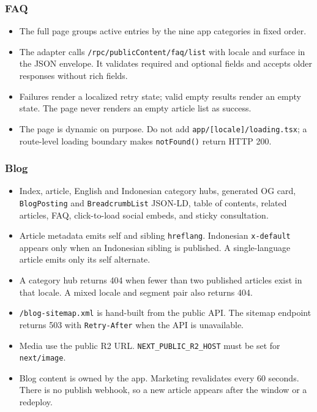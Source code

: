 \documentclass[11pt,a4paper]{article}
\newcommand{\code}[1]{\texttt{#1}}
\begin{document}
\subsubsection{FAQ}
\begin{itemize}
	\item The full page groups active entries by the nine app categories in fixed order.
	\item The adapter calls \code{/rpc/publicContent/\allowbreak faq/list} with locale and surface in the JSON envelope. It validates required and optional fields and accepts older responses without rich fields.
	\item Failures render a localized retry state; valid empty results render an empty state. The page never renders an empty article list as success.
	\item The page is dynamic on purpose. Do not add \code{app/[locale]/\allowbreak loading.tsx}; a route-level loading boundary makes \code{notFound()} return HTTP 200.
\end{itemize}

\subsubsection{Blog}
\begin{itemize}
	\item Index, article, English and Indonesian category hubs, generated OG card, \code{BlogPosting} and \code{BreadcrumbList} JSON-LD, table of contents, related articles, FAQ, click-to-load social embeds, and sticky consultation.
	\item Article metadata emits self and sibling \code{hreflang}. Indonesian \code{x-default} appears only when an Indonesian sibling is published. A single-language article emits only its self alternate.
	\item A category hub returns 404 when fewer than two published articles exist in that locale. A mixed locale and segment pair also returns 404.
	\item \code{/blog-sitemap.xml} is hand-built from the public API. The sitemap endpoint returns 503 with \code{Retry-After} when the API is unavailable.
	\item Media use the public R2 URL. \code{NEXT\_PUBLIC\_R2\_HOST} must be set for \code{next/image}.
	\item Blog content is owned by the app. Marketing revalidates every 60 seconds. There is no publish webhook, so a new article appears after the window or a redeploy.
\end{itemize}
\end{document}

